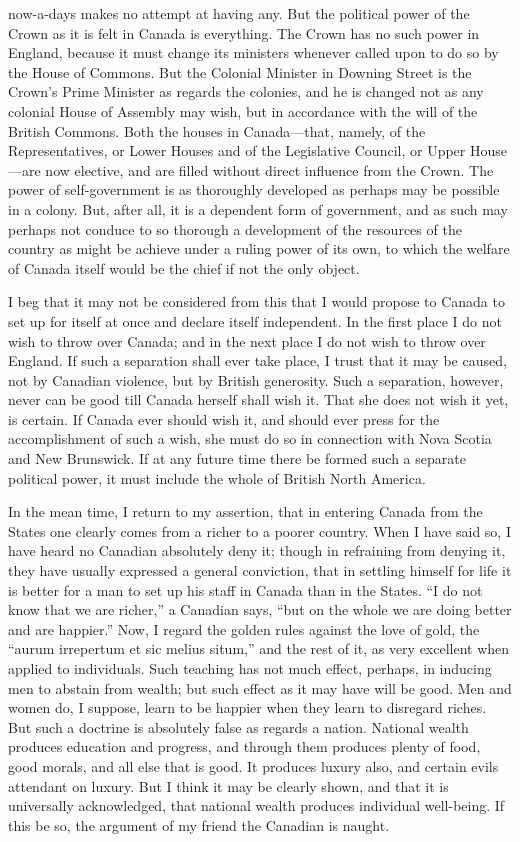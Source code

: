 now-a-days makes no attempt at having any.  But the political power
of the Crown as it is felt in Canada is everything.  The Crown has
no such power in England, because it must change its ministers
whenever called upon to do so by the House of Commons.  But the
Colonial Minister in Downing Street is the Crown's Prime Minister
as regards the colonies, and he is changed not as any colonial
House of Assembly may wish, but in accordance with the will of the
British Commons.  Both the houses in Canada---that, namely, of the
Representatives, or Lower Houses and of the Legislative Council, or
Upper House---are now elective, and are filled without direct
influence from the Crown.  The power of self-government is as
thoroughly developed as perhaps may be possible in a colony.  But,
after all, it is a dependent form of government, and as such may
perhaps not conduce to so thorough a development of the resources
of the country as might be achieve under a ruling power of its own,
to which the welfare of Canada itself would be the chief if not the
only object.

I beg that it may not be considered from this that I would propose
to Canada to set up for itself at once and declare itself
independent.  In the first place I do not wish to throw over
Canada; and in the next place I do not wish to throw over England.
If such a separation shall ever take place, I trust that it may be
caused, not by Canadian violence, but by British generosity.  Such
a separation, however, never can be good till Canada herself shall
wish it.  That she does not wish it yet, is certain.  If Canada
ever should wish it, and should ever press for the accomplishment
of such a wish, she must do so in connection with Nova Scotia and
New Brunswick.  If at any future time there be formed such a
separate political power, it must include the whole of British
North America.

In the mean time, I return to my assertion, that in entering Canada
from the States one clearly comes from a richer to a poorer
country.  When I have said so, I have heard no Canadian absolutely
deny it; though in refraining from denying it, they have usually
expressed a general conviction, that in settling himself for life
it is better for a man to set up his staff in Canada than in the
States.  ``I do not know that we are richer,'' a Canadian says, ``but
on the whole we are doing better and are happier.''  Now, I regard
the golden rules against the love of gold, the ``aurum irrepertum et
sic melius situm,'' and the rest of it, as very excellent when
applied to individuals.  Such teaching has not much effect,
perhaps, in inducing men to abstain from wealth; but such effect as
it may have will be good.  Men and women do, I suppose, learn to be
happier when they learn to disregard riches.  But such a doctrine
is absolutely false as regards a nation.  National wealth produces
education and progress, and through them produces plenty of food,
good morals, and all else that is good.  It produces luxury also,
and certain evils attendant on luxury.  But I think it may be
clearly shown, and that it is universally acknowledged, that
national wealth produces individual well-being.  If this be so, the
argument of my friend the Canadian is naught.

